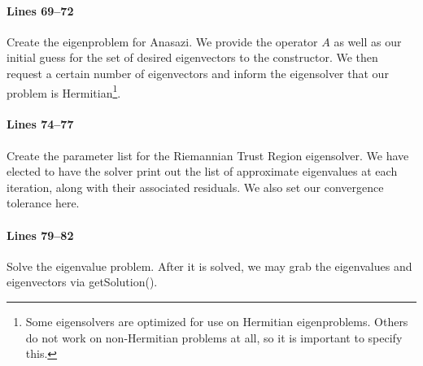 \paragraph{Lines 69--72}
Create the eigenproblem for Anasazi.  We provide the operator $A$ as well as our
initial guess for the set of desired eigenvectors to the constructor.  We then
request a certain number of eigenvectors and inform the eigensolver that our
problem is Hermitian\footnote{Some eigensolvers are optimized for use on
Hermitian eigenproblems.  Others do not work on non-Hermitian problems at
all, so it is important to specify this.}.

\paragraph{Lines 74--77}
Create the parameter list for the Riemannian Trust Region eigensolver.  We have
elected to have the solver print out the list of approximate eigenvalues at each
iteration, along with their associated residuals.  We also set our convergence
tolerance here.

\paragraph{Lines 79--82}
Solve the eigenvalue problem.  After it is solved, we may grab the eigenvalues
and eigenvectors via getSolution().
